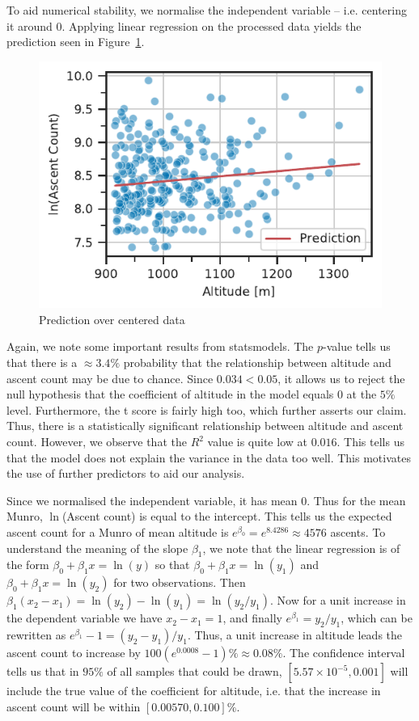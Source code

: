 \documentclass[11pt,a4paper]{article}
\begin{document}
To aid numerical stability, we normalise the independent variable – i.e. centering it around 0. Applying linear regression on the processed data yields the prediction seen in Figure~\ref{fds-project-template:fig:q1_prediction}.
\begin{figure} [h!]
  \centering
  \includegraphics{report/q1_prediction.pdf}
  \caption{Prediction over centered data}
  \label{fds-project-template:fig:q1_prediction}
\end{figure}
Again, we note some important results from statsmodels. The $p$-value tells us that there is a $\approx 3.4\%$ probability that the relationship between altitude and ascent count may be due to chance. Since $0.034 < 0.05$, it allows us to reject the null hypothesis that the coefficient of altitude in the model equals 0 at the $5\%$ level. Furthermore, the t score is fairly high too, which further asserts our claim. Thus, there is a statistically significant relationship between altitude and ascent count. However, we observe that the $R^{2}$ value is quite low at $0.016$. This tells us that the model does not explain the variance in the data too well. This motivates the use of further predictors to aid our analysis.

Since we normalised the independent variable, it has mean 0. Thus for the mean Munro, $\ln$(Ascent count) is equal to the intercept. This tells us the expected ascent count for a Munro of mean altitude is $e^{\beta_0}=e^{8.4286}\approx 4576$ ascents. To understand the meaning of the slope $\beta_1$, we note that the linear regression is of the form $\beta_0 + \beta_1x = \ln(y)$ so that $\beta_0 + \beta_1x = \ln(y_1)$ and $\beta_0 + \beta_1x = \ln(y_2)$ for two observations. Then $\beta_1(x_2 - x_1) = \ln(y_2) - \ln(y_1) = \ln(y_2 / y_1)$. Now for a unit increase in the dependent variable we have $x_2 - x_1 = 1$, and finally $e^{\beta_1} = y_2 / y_1$, which can be rewritten as $e^{\beta_1} - 1 = (y_2 - y_1) / y_1$. Thus, a unit increase in altitude leads the ascent count to increase by $100(e^{0.0008} - 1)\% \approx 0.08\%$. The confidence interval tells us that in $95\%$ of all samples that could be drawn, $[5.57 \times 10^{-5}, 0.001]$ will include the true value of the coefficient for altitude, i.e. that the increase in ascent count will be within $[0.00570, 0.100]\%$.
\end{document}
